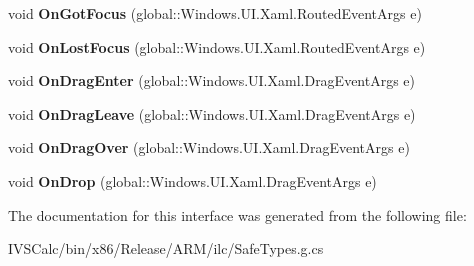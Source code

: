 \begin{DoxyCompactItemize}
\item 
\mbox{\label{interface_windows_1_1_u_i_1_1_xaml_1_1_controls_1_1_i_control_overrides_a1c1a1e5d6fc39f32869c47a552212ee0}} 
void {\bfseries On\+Got\+Focus} (global\+::\+Windows.\+U\+I.\+Xaml.\+Routed\+Event\+Args e)
\item 
\mbox{\label{interface_windows_1_1_u_i_1_1_xaml_1_1_controls_1_1_i_control_overrides_a80691518ccea9ce0f7e70de5587484e9}} 
void {\bfseries On\+Lost\+Focus} (global\+::\+Windows.\+U\+I.\+Xaml.\+Routed\+Event\+Args e)
\item 
\mbox{\label{interface_windows_1_1_u_i_1_1_xaml_1_1_controls_1_1_i_control_overrides_a1280bc2b7ee923b5a5397efcbda9079d}} 
void {\bfseries On\+Drag\+Enter} (global\+::\+Windows.\+U\+I.\+Xaml.\+Drag\+Event\+Args e)
\item 
\mbox{\label{interface_windows_1_1_u_i_1_1_xaml_1_1_controls_1_1_i_control_overrides_ad912c36efdbd2599a06d130b9db16f83}} 
void {\bfseries On\+Drag\+Leave} (global\+::\+Windows.\+U\+I.\+Xaml.\+Drag\+Event\+Args e)
\item 
\mbox{\label{interface_windows_1_1_u_i_1_1_xaml_1_1_controls_1_1_i_control_overrides_a091a0e8dba664dfaa389deeaf75b3f24}} 
void {\bfseries On\+Drag\+Over} (global\+::\+Windows.\+U\+I.\+Xaml.\+Drag\+Event\+Args e)
\item 
\mbox{\label{interface_windows_1_1_u_i_1_1_xaml_1_1_controls_1_1_i_control_overrides_ac1a4b6c33e44adddf387a5fe1ea803fb}} 
void {\bfseries On\+Drop} (global\+::\+Windows.\+U\+I.\+Xaml.\+Drag\+Event\+Args e)
\end{DoxyCompactItemize}


The documentation for this interface was generated from the following file\+:\begin{DoxyCompactItemize}
\item 
I\+V\+S\+Calc/bin/x86/\+Release/\+A\+R\+M/ilc/Safe\+Types.\+g.\+cs\end{DoxyCompactItemize}

